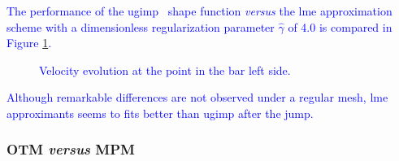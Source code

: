 \documentclass[preprint,12pt,a4paper]{elsarticle}
\begin{document}
\textcolor{blue}{The performance of the \acrshort{ugimp}~\cite{Bardenhagen2004} shape function \textit{versus} the \acrshort{lme} approximation scheme with a dimensionless regularization parameter $\widehat{\gamma}$ of 4.0 is compared in Figure \ref{fig:Dyka-uGIMP-LME}.
\begin{figure}
  \centering
  \caption{Velocity evolution at the point in the bar left side.}
  \label{fig:Dyka-uGIMP-LME}
\end{figure}
 Although remarkable differences are not observed under a regular mesh, \acrshort{lme} approximants seems to fits better than \acrshort{ugimp} after the jump.}

\subsubsection{OTM \textit{versus} MPM}
\label{sec:OTM-vs-MPM}
\end{document}
